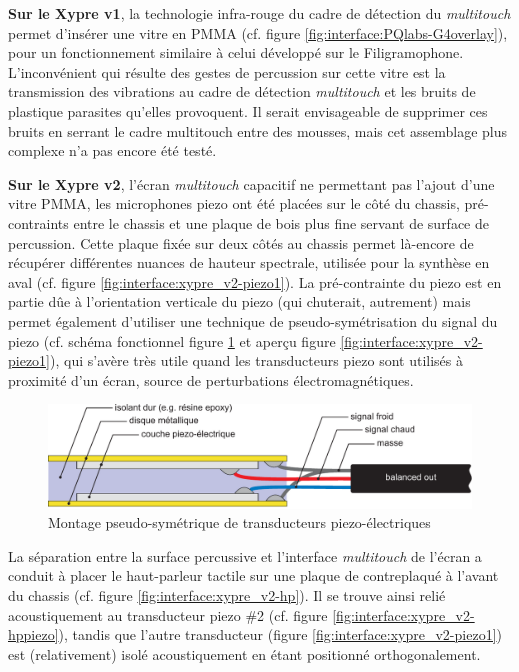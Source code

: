 \indent \textbf{Sur le Xypre v1}, la technologie infra-rouge du cadre de détection du \textit{multitouch} permet d'insérer une vitre en \gls{PMMA} (cf. figure \ref{fig:interface:PQlabs-G4overlay}), pour un fonctionnement similaire à celui développé sur le Filigramophone. L'inconvénient qui résulte des gestes de percussion sur cette vitre est la transmission des vibrations au cadre de détection \textit{multitouch} et les bruits de plastique parasites qu'elles provoquent. Il serait envisageable de supprimer ces bruits en serrant le cadre multitouch entre des mousses, mais cet assemblage plus complexe n'a pas encore été testé.

\indent \textbf{Sur le Xypre v2}, l'écran \textit{multitouch} capacitif ne permettant pas l'ajout d'une vitre \gls{PMMA}, les microphones piezo ont été placées sur le côté du chassis, pré-contraints entre le chassis et une plaque de bois plus fine servant de surface de percussion. Cette plaque fixée sur deux côtés au chassis permet là-encore de récupérer différentes nuances de hauteur spectrale, utilisée pour la synthèse en aval (cf. figure \ref{fig:interface:xypre_v2-piezo1}). La pré-contrainte du piezo est en partie dûe à l'orientation verticale du piezo (qui chuterait, autrement) mais permet également d'utiliser une technique de pseudo-symétrisation du signal du piezo (cf. schéma fonctionnel figure \ref{fig:interface:balancedPiezo} et aperçu figure \ref{fig:interface:xypre_v2-piezo1}), qui s'avère très utile quand les transducteurs piezo sont utilisés à proximité d'un écran, source de perturbations électromagnétiques.\\
\begin{figure}[!htbp]
	\captionsetup{format=plain}%
	\includegraphics[width=\textwidth]{gfx/05_interfaces/balancedPiezo.pdf}
	\caption{Montage pseudo-symétrique de transducteurs piezo-électriques}
	\label{fig:interface:balancedPiezo}
\end{figure}
\indent La séparation entre la surface percussive et l'interface \textit{multitouch} de l'écran a conduit à placer le haut-parleur tactile sur une plaque de contreplaqué à l'avant du chassis (cf. figure \ref{fig:interface:xypre_v2-hp}). Il se trouve ainsi relié acoustiquement au transducteur piezo \#2 (cf. figure \ref{fig:interface:xypre_v2-hppiezo}), tandis que l'autre transducteur (figure \ref{fig:interface:xypre_v2-piezo1}) est (relativement) isolé acoustiquement en étant positionné orthogonalement.

